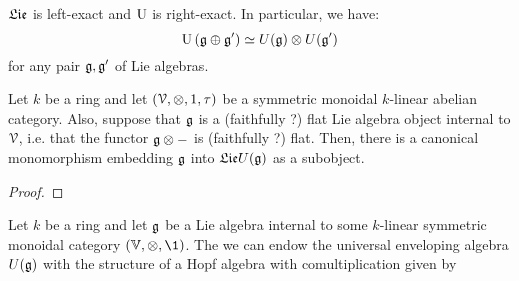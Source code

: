         \begin{corollary}
            $\mathfrak{Lie}$ is left-exact and $\mathrm{U}$ is right-exact. In particular, we have:
                $$\U\left(\g \oplus \g'\right) \cong U(\g) \tensor U(\g')$$
            for any pair $\mathfrak{g}, \mathfrak{g}'$ of Lie algebras. 
        \end{corollary}
        \begin{theorem} \label{theorem: embedding_lie_algebras_into_their_universal_enveloping_algebras}
            Let $k$ be a ring and let $(\calV, \tensor, 1, \tau)$ be a symmetric monoidal $k$-linear abelian category. Also, suppose that $\mathfrak{g}$ is a (faithfully ?) flat Lie algebra object internal to $\mathcal{V}$, i.e. that the functor $\g \tensor -$ is (faithfully ?) flat. Then, there is a canonical monomorphism embedding $\mathfrak{g}$ into $\mathfrak{Lie} U(\mathfrak{g})$ as a subobject.
        \end{theorem}
            \begin{proof}
                
            \end{proof}
        \begin{corollary} \label{coro: universal_enveloping_algebras_are_bialgebras}
            Let $k$ be a ring and let $\mathfrak{g}$ be a Lie algebra internal to some $k$-linear symmetric monoidal category $(\V, \tensor, \1)$. The we can endow the universal enveloping algebra $U(\mathfrak{g})$ with the structure of a Hopf algebra with comultiplication given by 
        \end{corollary}
        
